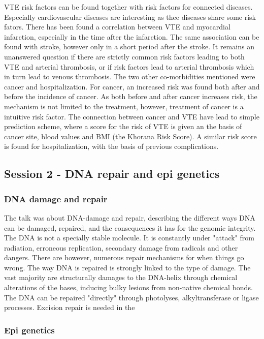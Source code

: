 \documentclass[12p]{article}
\begin{document}
VTE risk factors can be found together with risk factors for connected diseases.
Especially cardiovascular diseases are interesting as thee diseases share some risk fators.
There has been found a correlation between VTE and myocardial infarction, especially in the time after the infarction.
The same association can be found with stroke, however only in a short period after the stroke.
It remains an unanswered question if there are strictly common risk factors leading to both VTE and arterial thrombosis, or if risk factors lead to arterial thrombosis which in turn lead to venous thrombosis.
The two other co-morbidities mentioned were cancer and hospitalization.
For cancer, an increased risk was found both after and before the incidence of cancer.
As both before and after cancer increases risk, the mechanism is not limited to the treatment, however, treatment of cancer is a intuitive risk factor.
The connection between cancer and VTE have lead to simple prediction scheme, where a score for the risk of VTE is given an the basis of cancer site, blood values and BMI (the Khorana Risk Score).
A similar risk score is found for hospitalization, with the basis of previous complications.

\subsection*{Session 2 - DNA repair and epi genetics}

\subsubsection{DNA damage and repair}

The talk was about DNA-damage and repair, describing the different ways DNA can be damaged, repaired, and the consequences it has for the genomic integrity.
The DNA is not a specially stable molecule.
It is constantly under "attack" from radiation, erroneous replication, secondary damage from radicals and other dangers.
There are however, numerous repair mechanisms for when things go wrong.
The way DNA is repaired is strongly linked to the type of damage.
The vast majority are structurally damages to the DNA-helix through chemical alterations of the bases, inducing bulky lesions from non-native chemical bonds.
The DNA can be repaired "directly" through photolyses, alkyltransferase or ligase processes.
Excision repair is needed in the 

\subsubsection{Epi genetics}
\end{document}
